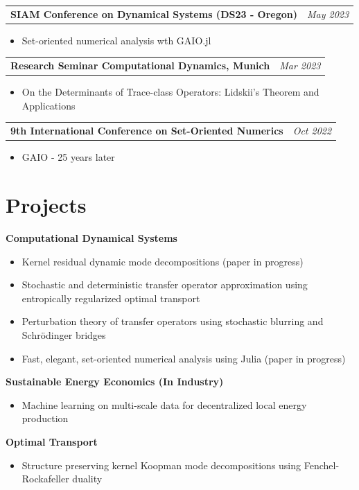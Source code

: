 \documentclass[10pt,a4paper]{article}
\makeatletter
\newcommand{\datedentry}[2]{%
    \begin{tabularx}{\textwidth}{@{}X>{\raggedleft\arraybackslash}p{4cm}@{}}
        #1 & \textit{#2}
    \end{tabularx}%
}
\makeatother
\begin{document}
\smallskip
\datedentry{\textbf{SIAM Conference on Dynamical Systems (DS23 - Oregon)}}{May 2023}
\begin{itemize}
    \item Set-oriented numerical analysis wth GAIO.jl
\end{itemize}

\smallskip
\datedentry{\textbf{Research Seminar Computational Dynamics, Munich}}{Mar 2023}
\begin{itemize}
    \item On the Determinants of Trace-class Operators: Lidskii's Theorem and Applications
\end{itemize}

\smallskip
\datedentry{\textbf{9th International Conference on Set-Oriented Numerics}}{Oct 2022}
\begin{itemize}
    \item GAIO - 25 years later
\end{itemize}

\iffalse
\section{Projects}

\textbf{Computational Dynamical Systems}
\begin{itemize}
    \item Kernel residual dynamic mode decompositions (paper in progress)
    \item Stochastic and deterministic transfer operator approximation using entropically regularized optimal transport
    \item Perturbation theory of transfer operators using stochastic blurring and Schrödinger bridges
    \item Fast, elegant, set-oriented numerical analysis using Julia (paper in progress)
\end{itemize}

\medskip
\textbf{Sustainable Energy Economics (In Industry)}
\begin{itemize}
    \item Machine learning on multi-scale data for decentralized local energy production
\end{itemize}

\medskip
\textbf{Optimal Transport}
\begin{itemize}
    \item Structure preserving kernel Koopman mode decompositions using Fenchel-Rockafeller duality
\end{itemize}
\end{document}

